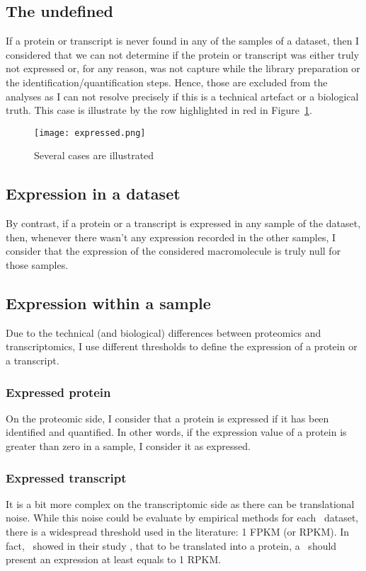 \subsection{The undefined}
\label{sec:IntegrationExpressedOrNot-undefined}
If a protein or transcript is never found in any of the samples of a dataset,
then I considered that we can not determine if the protein or transcript was
either truly not expressed or, for any reason, was not capture while the library
preparation or the identification/quantification steps. Hence, those are
excluded from the analyses as I can not resolve precisely if this is a
technical artefact or a biological truth. This case is illustrate by the row
highlighted in red in Figure~\ref{DefineExpression}.

\begin{figure}%
\texttt{[image: expressed.png]}\centering
    \caption{\label{DefineExpression}Several cases are illustrated}
\end{figure}

\subsection{Expression in a dataset}
\label{sec:IntegrationExpressedOrNot--expDataset}
By contrast, if a protein or a transcript is expressed in any sample of the
dataset, then, whenever there wasn't any expression recorded in the other
samples, I consider that the expression of the considered macromolecule is truly
null for those samples.

\subsection{Expression within a sample}
Due to the technical (and biological) differences between proteomics and
transcriptomics, I use different thresholds to define the expression of a protein
or a transcript.


\subsubsection{Expressed protein}
On the proteomic side, I consider that a protein is expressed if it has been
identified and quantified. In other words, if the expression value of a protein
is greater than zero in a sample, I consider it as expressed.

\subsubsection{Expressed transcript}
It is a bit more complex on the transcriptomic side as there can be
translational noise. While this noise could be evaluate by empirical methods for
each \Rnaseq\ dataset, there is a widespread threshold used in the literature:
1 \gls{FPKM} (or \gls{RPKM}). In fact,~\cite{Hebenstreit:2011} showed in
their study , that to be translated into a protein, a \mRNA\ should
present an expression at least equals to 1 \gls{RPKM}.

